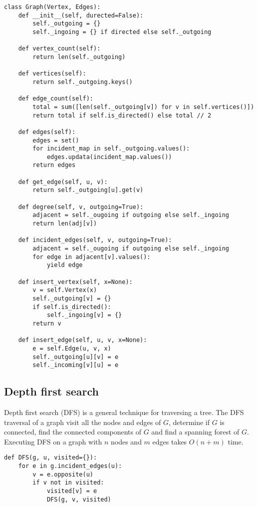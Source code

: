 \documentclass[10pt]{article}
\begin{document}
\begin{verbatim}
class Graph(Vertex, Edges):
    def __init__(self, durected=False):
        self._outgoing = {}
        self._ingoing = {} if directed else self._outgoing
        
    def vertex_count(self):
        return len(self._outgoing)
        
    def vertices(self):
        return self._outgoing.keys()
        
    def edge_count(self):
        total = sum([len(self._outgoing[v]) for v in self.vertices()])
        return total if self.is_directed() else total // 2
        
    def edges(self):
        edges = set()
        for incident_map in self._outgoing.values():
            edges.updata(incident_map.values())
        return edges
        
    def get_edge(self, u, v):
        return self._outgoing[u].get(v)
        
    def degree(self, v, outgoing=True):
        adjacent = self._ougoing if outgoing else self._ingoing
        return len(adj[v])
        
    def incident_edges(self, v, outgoing=True):
        adjacent = self._ougoing if outgoing else self._ingoing
        for edge in adjacent[v].values():
            yield edge
    
    def insert_vertex(self, x=None):
        v = self.Vertex(x)
        self._outgoing[v] = {}
        if self.is_directed():
            self._ingoing[v] = {}
        return v
        
    def insert_edge(self, u, v, x=None):
        e = self.Edge(u, v, x)
        self._outgoing[u][v] = e
        self._incoming[v][u] = e
\end{verbatim}

\subsection{Depth first search}
Depth first search (DFS) is a general technique for traversing a tree. The DFS traversal of a graph visit all the nodes and edges of $G$, determine if $G$ is connected, find the connected components of $G$ and find a spanning forest of $G$. Executing DFS on a graph with $n$ nodes and $m$ edges takes $O(n+m)$ time. 

\begin{verbatim}
def DFS(g, u, visited={}):
    for e in g.incident_edges(u):
        v = e.opposite(u)
        if v not in visited:
            visited[v] = e
            DFS(g, v, visited)
\end{verbatim}
\end{document}
